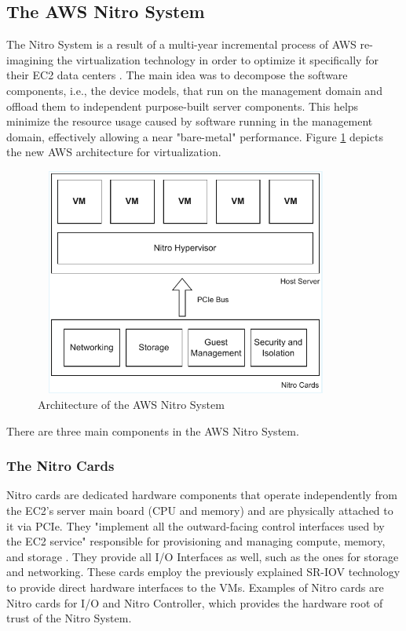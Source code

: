 \subsection{The AWS Nitro System}
The Nitro System is a result of a multi-year incremental process of AWS re-imagining the virtualization 
technology in order to optimize it specifically for their EC2 data centers \cite{nitro_whitepaper}. 
The main idea was to decompose the software components, i.e., the device models, 
that run on the management domain and offload them to independent purpose-built server components. 
This helps minimize the resource usage caused by software running in the management domain, effectively 
allowing a near "bare-metal" performance. Figure \ref{fig:nitro} depicts the new AWS
architecture for virtualization. 
\begin{figure}[H]
  \centering
  \includegraphics[width=10cm, height=7.5cm]{figures/nitro}
  \caption{Architecture of the AWS Nitro System \cite{nitro_whitepaper}}
  \label{fig:nitro}
\end{figure}
\noindent
There are three main components in the AWS Nitro System. 
\subsubsection{The Nitro Cards}
Nitro cards are dedicated hardware components that operate independently from the EC2's server main board 
(CPU and memory) and are physically attached to it via PCIe. They "implement all the outward-facing 
control interfaces used by the EC2 service" responsible for provisioning and managing compute, memory, 
and storage \cite{nitro_whitepaper}. They provide all I/O Interfaces as well, such 
as the ones for storage and networking. These cards employ the previously explained SR-IOV technology to 
provide direct hardware interfaces to the VMs. Examples of Nitro cards are Nitro cards for I/O and 
Nitro Controller, which provides the hardware root of trust of the Nitro System. 

